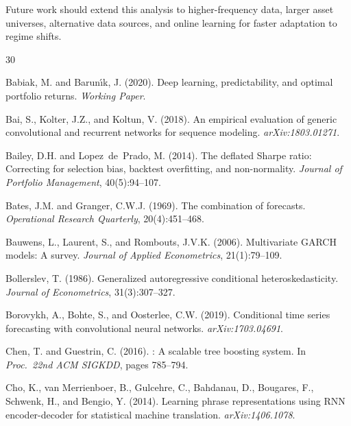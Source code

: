\documentclass[11pt,a4paper,twocolumn]{article}
\begin{document}
Future work should extend this analysis to higher-frequency data, larger asset
universes, alternative data sources, and online learning for faster adaptation
to regime shifts.




\begin{thebibliography}{30}

Babiak, M. and Barun{\'\i}k, J. (2020).
\newblock Deep learning, predictability, and optimal portfolio returns.
\newblock \emph{Working Paper}.

Bai, S., Kolter, J.Z., and Koltun, V. (2018).
\newblock An empirical evaluation of generic convolutional and recurrent
  networks for sequence modeling.
\newblock \emph{arXiv:1803.01271}.

Bailey, D.H. and Lopez~de~Prado, M. (2014).
\newblock The deflated {S}harpe ratio: Correcting for selection bias, backtest
  overfitting, and non-normality.
\newblock \emph{Journal of Portfolio Management}, 40(5):94--107.

Bates, J.M. and Granger, C.W.J. (1969).
\newblock The combination of forecasts.
\newblock \emph{Operational Research Quarterly}, 20(4):451--468.

Bauwens, L., Laurent, S., and Rombouts, J.V.K. (2006).
\newblock Multivariate {GARCH} models: A survey.
\newblock \emph{Journal of Applied Econometrics}, 21(1):79--109.

Bollerslev, T. (1986).
\newblock Generalized autoregressive conditional heteroskedasticity.
\newblock \emph{Journal of Econometrics}, 31(3):307--327.

Borovykh, A., Bohte, S., and Oosterlee, C.W. (2019).
\newblock Conditional time series forecasting with convolutional neural
  networks.
\newblock \emph{arXiv:1703.04691}.

Chen, T. and Guestrin, C. (2016).
: A scalable tree boosting system.
\newblock In \emph{Proc.\ 22nd ACM SIGKDD}, pages 785--794.

Cho, K., van Merrienboer, B., Gulcehre, C., Bahdanau, D., Bougares, F.,
  Schwenk, H., and Bengio, Y. (2014).
\newblock Learning phrase representations using {RNN} encoder-decoder for
  statistical machine translation.
\newblock \emph{arXiv:1406.1078}.


\end{thebibliography}
\end{document}
